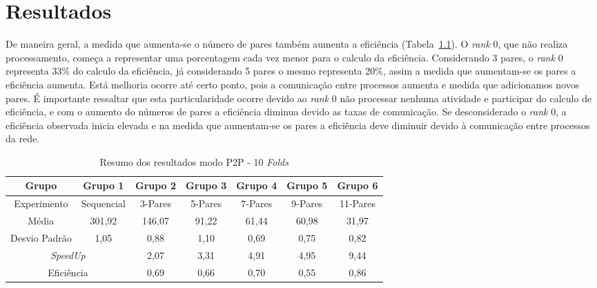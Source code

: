 \chapter{Resultados}

De maneira geral, a medida que aumenta-se o número de pares também aumenta a eficiência (Tabela~\ref{tab:p2p}). O \textit{rank} 0, que não realiza processamento, começa a representar uma porcentagem cada vez menor para o calculo da eficiência. Considerando 3 pares, o \textit{rank} 0 representa 33\% do calculo da eficiência, já considerando 5 pares o mesmo representa 20\%, assim a medida que aumentam-se os pares a eficiência aumenta. Está melhoria ocorre até certo ponto, pois a comunicação entre processos aumenta e medida que adicionamos novos pares. É importante ressaltar que esta particularidade ocorre devido ao \textit{rank} 0 não processar nenhuma atividade e participar do calculo de eficiência, e com o aumento do números de pares a eficiência diminua devido as taxas de comunicação. Se desconsiderado o \textit{rank} 0, a eficiência observada inicia elevada e na medida que aumentam-se os pares a eficiência deve diminuir devido à comunicação entre processos da rede.

\begin{table}[!h]
\caption{ Resumo dos resultados modo P2P - 10 \textit{Folds} }
\label{tab:p2p}
\centering
\setlength{\tabcolsep}{5pt}
\begin{tabular}{ccccccc}
\hline
Grupo &Grupo 1 &Grupo 2 &Grupo 3 &Grupo 4 &Grupo 5 &Grupo 6 \\
\hline
Experimento &Sequencial &3-Pares &5-Pares &7-Pares &9-Pares &11-Pares \\
\hline
Média &301,92 &146,07 &91,22 &61,44 &60,98 &31,97 \\
\hline
Desvio Padrão &1,05 &0,88 &1,10 &0,69 &0,75 &0,82 \\
\hline
\multicolumn{2}{c}{\textit{SpeedUp}} &2,07 &3,31 &4,91 &4,95 &9,44 \\
\hline
\multicolumn{2}{c}{Eficiência} &0,69 &0,66 &0,70 &0,55 &0,86 \\
\hline
\end{tabular}
\end{table}
